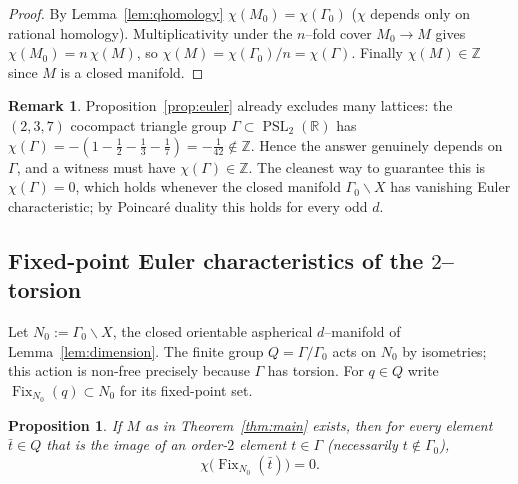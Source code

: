 \documentclass[12pt]{article}
\newcommand{\bR}{\mathbb{R}}
\newcommand{\bZ}{\mathbb{Z}}
\newcommand{\Fix}{\operatorname{Fix}}
\DeclareMathOperator{\PSL}{PSL}
\newtheorem{proposition}{Proposition}
\theoremstyle{definition}
\newtheorem{remark}{Remark}
\begin{document}
\begin{proof}
By Lemma~\ref{lem:qhomology} $\chi(M_0)=\chi(\Gamma_0)$ ($\chi$ depends only on
rational homology).  Multiplicativity under the $n$--fold cover $M_0\to M$ gives
$\chi(M_0)=n\,\chi(M)$, so $\chi(M)=\chi(\Gamma_0)/n=\chi(\Gamma)$.  Finally
$\chi(M)\in\bZ$ since $M$ is a closed manifold.
\end{proof}

\begin{remark}\label{rem:triangle}
Proposition~\ref{prop:euler} already excludes many lattices: the $(2,3,7)$
cocompact triangle group $\Gamma\subset\PSL_2(\bR)$ has
$\chi(\Gamma)=-(1-\tfrac12-\tfrac13-\tfrac17)=-\tfrac1{42}\notin\bZ$.  Hence the
answer genuinely depends on $\Gamma$, and a witness must have $\chi(\Gamma)\in\bZ$.
The cleanest way to guarantee this is $\chi(\Gamma)=0$, which holds whenever the
closed manifold $\Gamma_0\backslash X$ has vanishing Euler characteristic; by
Poincar\'e duality this holds for every odd $d$.
\end{remark}

\subsection{Fixed-point Euler characteristics of the $2$--torsion}

Let $N_0:=\Gamma_0\backslash X$, the closed orientable aspherical $d$--manifold of
Lemma~\ref{lem:dimension}.  The finite group $Q=\Gamma/\Gamma_0$ acts on $N_0$ by
isometries; this action is non-free precisely because $\Gamma$ has torsion.  For
$q\in Q$ write $\Fix_{N_0}(q)\subset N_0$ for its fixed-point set.

\begin{proposition}\label{prop:lefschetz}
If $M$ as in Theorem~\ref{thm:main} exists, then for every element $\bar t\in Q$
that is the image of an order-$2$ element $t\in\Gamma$ (necessarily
$t\notin\Gamma_0$),
\[
   \chi\bigl(\Fix_{N_0}(\bar t)\bigr)=0 .
\]
\end{proposition}
\end{document}
